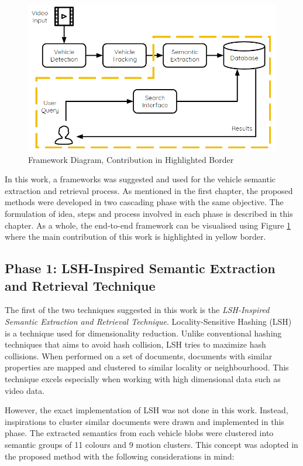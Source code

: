 \begin{figure}[hbt!]\centering
\includegraphics[width=.9\textwidth]{image/new/framework_new.PNG}
\caption{Framework Diagram, Contribution in Highlighted Border}
\label{fig:framework}
\end{figure}


In this work, a frameworks was suggested and used for the vehicle semantic extraction and retrieval process.
As mentioned in the first chapter, the proposed methods were developed in two cascading phase with the same objective.
The formulation of idea, steps and process involved in each phase is described in this chapter.
As a whole, the end-to-end framework can be visualised using Figure \ref{fig:framework} where the main contribution of this work is highlighted in yellow border.

\subsection{Phase 1: LSH-Inspired Semantic Extraction and Retrieval Technique}
\label{subsec:lsh-intro}
The first of the two techniques suggested in this work is the \textit{LSH-Inspired Semantic Extraction and Retrieval Technique}. Locality-Sensitive Hashing (LSH) is a technique used for dimensionality reduction.
Unlike conventional hashing techniques that aims to avoid hash collision, LSH tries to maximize hash collisions.
When performed on a set of documents, documents with similar properties are mapped and clustered to similar locality or neighbourhood. This technique excels especially when working with high dimensional data such as video data.

However, the exact implementation of LSH was not done in this work. Instead, inspirations to cluster similar documents were drawn and implemented in this phase. The extracted semantics from each vehicle blobs were clustered into semantic groups of 11 colours and 9 motion clusters. This concept was adopted in the proposed method with the following considerations in mind:

